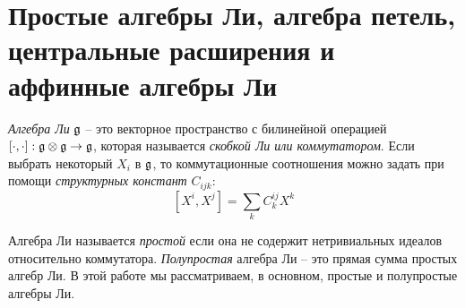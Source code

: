 \section{Простые алгебры Ли, алгебра петель, центральные расширения и аффинные алгебры Ли}

\label{sec:intro-simple-lie-algebras}

{\it Алгебра Ли} $\mathfrak{g}$ -- это векторное пространство с билинейной операцией $[\cdot,\cdot]:\mathfrak{g}\otimes\mathfrak{g}\to \mathfrak{g}$, которая называется  {\it скобкой Ли или коммутатором}. Если выбрать некоторый  $X_{i}$ в $\mathfrak{g}$, то коммутационные соотношения можно задать при помощи  {\it структурных констант} $C_{ijk}$:
\begin{equation}
  \label{eq:1}
  [X^{i},X^{j}]=\sum_{k} C^{ij}_{k} X^{k}
\end{equation}

Алгебра Ли называется {\it простой} если она не содержит нетривиальных идеалов относительно коммутатора. {\it Полупростая} алгебра Ли -- это прямая сумма простых алгебр Ли. В этой работе мы рассматриваем, в основном, простые и полупростые алгебры Ли.

